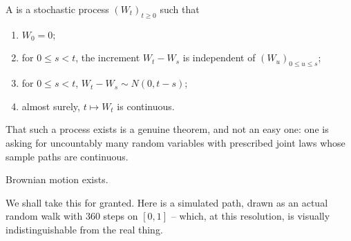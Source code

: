 \documentclass[a4paper]{scrartcl}
\begin{document}
\begin{definition}
	A  is a stochastic process $(W_t)_{t\geq0}$ such that
	\begin{enumerate}[label=(\roman*)]
		\item $W_0 = 0$;
		\item for $0 \leq s < t$, the increment $W_t - W_s$ is independent of $(W_u)_{0\leq u \leq s}$;
		\item for $0\leq s<t$, $W_t - W_s \sim N(0, t-s)$;
		\item almost surely, $t \mapsto W_t$ is continuous.
	\end{enumerate}
\end{definition}

That such a process exists is a genuine theorem, and not an easy one: one is asking for uncountably many random variables with prescribed joint laws whose sample paths are continuous.

\begin{theorem}[Wiener, 1923]
	Brownian motion exists.
\end{theorem}

We shall take this for granted. Here is a simulated path, drawn as an actual random walk with $360$ steps on $[0,1]$ -- which, at this resolution, is visually indistinguishable from the real thing.
\end{document}
